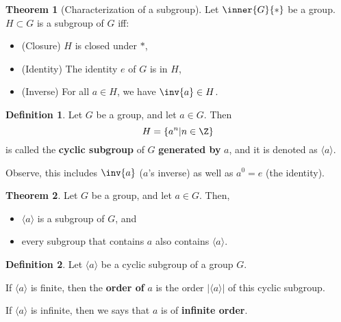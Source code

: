 \documentclass[a5paper]{article}
\newcommand{\cyclic}[1]{\langle#1\rangle}
\theoremstyle{definition}%
\newtheorem*{theorem*}{Theorem} %
\newtheorem*{definition*}{Definition}
\numberwithin{exercise}{section}
\theoremstyle{remark}%
\begin{document}
\begin{highlight}
\begin{theorem*}[Characterization of a subgroup]
Let $\inner{G}{*}$ be a group. $H\subset G$ is a subgroup of $G$ iff:
	\begin{itemize}
	\item (Closure) $H$ is closed under $*$,
	\item (Identity) The identity $e$ of $G$ is in $H$, 
	\item (Inverse) For all $a\in H$, we have $\inv{a}\in H$.	
	\end{itemize}
\end{theorem*}
\end{highlight}

\begin{highlight}
\begin{definition*}
Let $G$ be a group, and let $a\in G$. Then 
$$H=\{a^n|n\in \Z\}$$
is called the \textbf{cyclic subgroup} of $G$ \textbf{generated by }$a$, and it is denoted as $\langle a\rangle$.

\mbox{}

\noindent Observe, this includes $\inv{a}$ ($a$'s inverse) as well as $a^0=e$ (the identity). 
\end{definition*}
\end{highlight}

\begin{theorem*}
Let $G$ be a group, and let $a\in G$. Then,
	\begin{itemize}
	\item $\langle a\rangle$ is a subgroup of $G$, and 
	\item every subgroup that contains $a$ also contains $\langle a\rangle$. 
	\end{itemize}
\end{theorem*}

\begin{highlight}
\begin{definition*}
Let $\cyclic{a}$ be a cyclic subgroup of a group $G$. 

\noindent If $\cyclic{a}$ is finite, then the \textbf{order of} $a$ is the order $|\cyclic{a}|$ of this cyclic subgroup. 

\mbox{}

\noindent If $\cyclic{a}$ is infinite, then we says that $a$ is of \textbf{infinite order}. 
\end{definition*}
\end{highlight}
\end{document}
